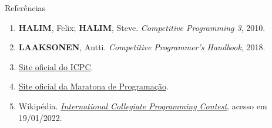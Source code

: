 \begin{frame}[fragile]{Referências}

    \begin{enumerate}
        \item \textbf{HALIM}, Felix; \textbf{HALIM}, Steve. \textit{Competitive Programming 3}, 2010.
        \item \textbf{LAAKSONEN}, Antti. \textit{Competitive Programmer's Handbook}, 2018.

        \item \href{https://icpc.baylor.edu/}{Site oficial do ICPC}.

        \item \href{http://maratona.ime.usp.br/}{Site oficial da Maratona de Programação}.

        \item Wikipédia. \href{https://en.wikipedia.org/wiki/ACM\_International\_Collegiate\_Programming\_Contest}{\it International Collegiate Programming Contest}, acesso em 19/01/2022.


    \end{enumerate}

\end{frame}
